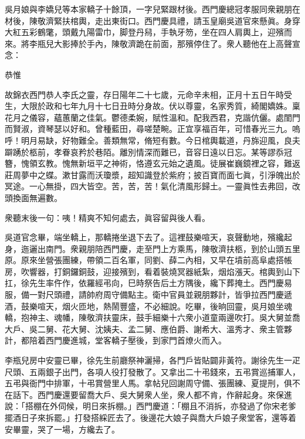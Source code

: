 吳月娘與李嬌兒等本家轎子十餘頂，一字兒緊跟材後。西門慶總冠孝服同衆親朋在材後，陳敬濟緊扶棺輿，走出東街口。西門慶具禮，請玉皇廟吳道官來懸眞。身穿大紅五彩鶴氅，頭戴九陽雷巾，脚登丹舄，手執牙笏，坐在四人肩輿上，迎殯而來。將李瓶兒大影捧於手內，陳敬濟跪在前面，那殯停住了。衆人聽他在上高聲宣念：

\begin{myquote}[\markfont]
恭惟

故錦衣西門恭人李氏之靈，存日陽年二十七歲，元命辛未相，正月十五日午時受生，大限於政和七年九月十七日丑時分身故。伏以尊靈，名家秀質，綺閣嬌姝。稟花月之儀容，蘊蕙蘭之佳氣。鬱德柔婉，賦性溫和。配我西君，克諧伉儷。處閨門而賢淑，資琴瑟以好和。曾種藍田，尋嗟楚畹。正宜享福百年，可惜春光三九。{}嗚呼！明月易缺，好物難全。善類無常，脩短有數。今日棺輿載道，丹旆迎風，良夫躃踴於柩前，孝眷哀矜於巷陌。離別情深而難已，音容日遠以日忘。某等謬忝冠簪，愧領玄教。愧無新垣平之神術，{}恪遵玄元始之遺風。徒展崔巍鏡裡之容，難返莊周夢中之蝶。漱甘露而沃瓊漿，超知識登於紫府；披百寶而面七眞，引淨魄出於冥途。一心無掛，四大皆空。苦，苦，苦！氣化清風形歸土。一靈眞性去弗回，改頭換面無遍數。

衆聽末後一句：咦！精爽不知何處去，眞容留與後人看。
\end{myquote}

吳道官念畢，端坐轎上，那轎捲坐退下去了。這裡鼓樂喧天，哀聲動地，殯纔起身，迤邐出南門。衆親朋陪西門慶，走至門上方乘馬，陳敬濟扶柩，到於山頭五里原。原來坐營張團練，帶領二百名軍，同劉、薛二內相，又早在墳前高阜處搭帳房，吹響器，打銅鑼銅鼓，迎接殯到，{}看着裝燒冥器紙紮，烟焰漲天。棺輿到山下扛，徐先生率仵作，依羅經弔向，巳時祭告后土方隅後，纔下葬掩土。西門慶易服，備一對尺頭禮，請帥府周守備點主。衛中官員並親朋夥計，皆爭拉西門慶遞酒，鼓樂喧天，烟火匝地，熱鬧豐盛，不必細說。吃畢，後晌回靈，吳月娘坐魂轎，抱神主、魂幡，陳敬濟扶靈床，鼓手細樂十六衆小道童兩邊吹打。吳大舅並喬大戶、吳二舅、花大舅、沈姨夫、孟二舅、應伯爵、謝希大、溫秀才、衆主管夥計，都陪着西門慶進城，堂客轎子壓後，到家門首燎火而入。

李瓶兒房中安靈已畢，徐先生前廳祭神灑掃，各門戶皆貼闢非黃符。謝徐先生一疋尺頭、五兩銀子出門，各項人役打發散了。又拿出二十弔錢來，五弔賞巡捕軍人，五弔與衙門中排軍，十弔賞營里人馬。拿帖兒回謝周守備、張團練、夏提刑，俱不在話下。西門慶還要留喬大戶、吳大舅衆人坐，衆人都不肯，作辭起身。來保進說：「搭棚在外伺候，明日來拆棚。」西門慶道：「棚且不消拆，亦發過了你宋老爹擺酒日子來拆罷。」打發搭綵匠去了。後邊花大娘子與喬大戶娘子衆堂客，還等着安畢靈，哭了一場，方纔去了。


